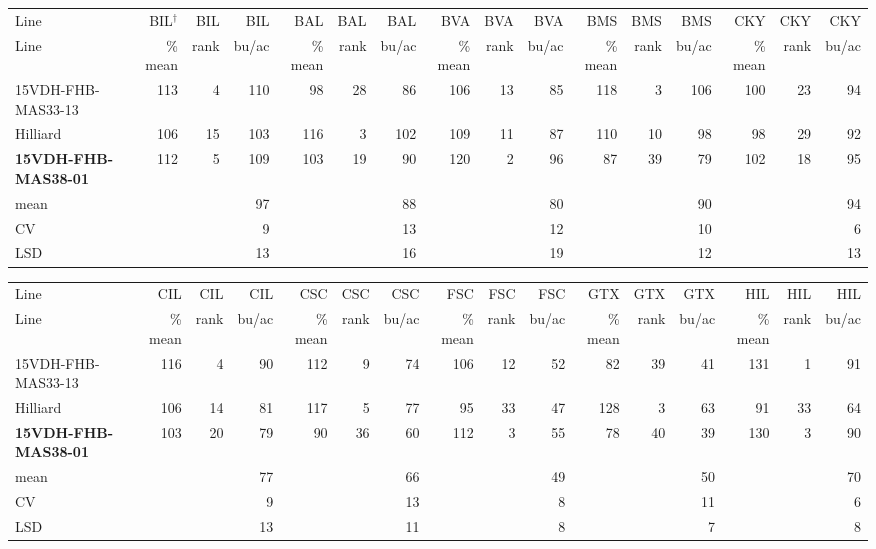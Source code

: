\documentclass[12pt, letterpaper]{article}
\begin{document}
\begin{landscape}
\begin{table}
\begin{tabular}{|l|rrr|rrr|rrr|rrr|rrr|}
  \hline
Line & BIL$^\dagger$ & BIL & BIL & BAL & BAL & BAL & BVA & BVA & BVA & BMS & BMS & BMS & CKY & CKY & CKY \\ 
Line & \% mean & rank & bu/ac & \% mean & rank & bu/ac & \% mean & rank & bu/ac & \% mean & rank & bu/ac & \% mean & rank & bu/ac \\ 
  \hline
15VDH-FHB-MAS33-13 & 113 &   4 & 110 &  98 &  28 &  86 & 106 &  13 &  85 & 118 &   3 & 106 & 100 &  23 &  94 \\ 
  Hilliard & 106 &  15 & 103 & 116 &   3 & 102 & 109 &  11 &  87 & 110 &  10 &  98 &  98 &  29 &  92 \\ 
  \textbf{15VDH-FHB-MAS38-01} & 112 &   5 & 109 & 103 &  19 &  90 & 120 &   2 &  96 &  87 &  39 &  79 & 102 &  18 &  95 \\ 
  mean &  &  &  97 &  &  &  88 &  &  &  80 &  &  &  90 &  &  &  94 \\ 
  CV &  &  &   9 &  &  &  13 &  &  &  12 &  &  &  10 &  &  &   6 \\ 
  LSD &  &  &  13 &  &  &  16 &  &  &  19 &  &  &  12 &  &  &  13 \\ 
   \hline
\end{tabular}

\bigskip

\begin{tabular}{|l|rrr|rrr|rrr|rrr|rrr|}
  \hline
Line & CIL & CIL & CIL & CSC & CSC & CSC & FSC & FSC & FSC & GTX & GTX & GTX & HIL & HIL & HIL \\ 
Line & \% mean & rank & bu/ac & \% mean & rank & bu/ac & \% mean & rank & bu/ac & \% mean & rank & bu/ac & \% mean & rank & bu/ac \\ 
  \hline
15VDH-FHB-MAS33-13 & 116 &   4 &  90 & 112 &   9 &  74 & 106 &  12 &  52 &  82 &  39 &  41 & 131 &   1 &  91 \\ 
  Hilliard & 106 &  14 &  81 & 117 &   5 &  77 &  95 &  33 &  47 & 128 &   3 &  63 &  91 &  33 &  64 \\ 
  \textbf{15VDH-FHB-MAS38-01} & 103 &  20 &  79 &  90 &  36 &  60 & 112 &   3 &  55 &  78 &  40 &  39 & 130 &   3 &  90 \\ 
  mean &  &  &  77 &  &  &  66 &  &  &  49 &  &  &  50 &  &  &  70 \\ 
  CV &  &  &   9 &  &  &  13 &  &  &   8 &  &  &  11 &  &  &   6 \\ 
  LSD &  &  &  13 &  &  &  11 &  &  &   8 &  &  &   7 &  &  &   8 \\ 
   \hline
\end{tabular}


\end{table}
\end{landscape}
\end{document}
